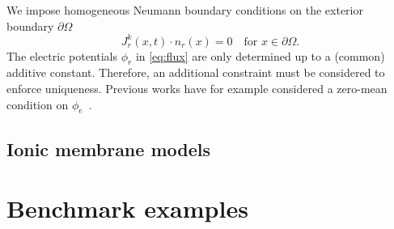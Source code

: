 \documentclass[fleqn,10pt]{wlscirep}
\begin{document}
We impose homogeneous Neumann boundary conditions on the exterior boundary $\partial \Omega$
\begin{equation}\label{eq::bc}
  J_r^k(x,t) \cdot n_r(x) = 0 \quad \text{for } x \in \partial\Omega.
\end{equation}
The electric potentials $\phi_r$ in \eqref{eq:flux} are only determined up to a (common) additive constant. Therefore, an additional constraint must be considered to enforce uniqueness. Previous works have for example considered a zero-mean condition on $\phi_e$~\cite{ellingsrud2020finite}. 

\subsection{Ionic membrane models}
\label{sec::ion}


\newpage
\section{Benchmark examples}


\newpage

\end{document}
